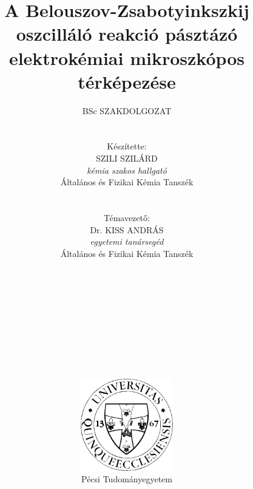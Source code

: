 \pagestyle{empty}

\title{\textbf{A Belouszov-Zsabotyinkszkij oszcilláló reakció pásztázó elektrokémiai mikroszkópos térképezése}}

\author{BSc SZAKDOLGOZAT\\
\\ \\ Készítette:\\ 
SZILI SZILÁRD \\
\emph{kémia szakos hallgató}\\
Általános és Fizikai Kémia Tanszék \\
\\ \\
Témavezető: \\
Dr. KISS ANDRÁS \\
\emph{egyetemi tanársegéd} \\
Általános és Fizikai Kémia Tanszék \\
\\ \\ \\ \\ \\ \\ \\ \\ \\ \\
\includegraphics[width=0.3\textwidth]{img/pte_logo.eps} \\
Pécsi Tudományegyetem}
\maketitle
\pagestyle{plain}

\large
\setcounter{tocdepth}{4}
\tableofcontents
